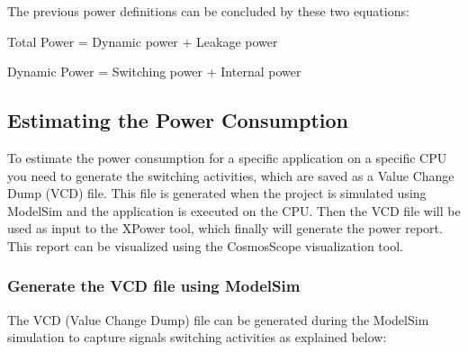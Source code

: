 \documentclass[
]{article}
\begin{document}
The previous power definitions can be concluded by these two equations:

Total Power = Dynamic power + Leakage power

Dynamic Power = Switching power + Internal power

\hypertarget{estimating-the-power-consumption}{%
\subsection{Estimating the Power
Consumption}\label{estimating-the-power-consumption}}

To estimate the power consumption for a specific application on a
specific CPU you need to generate the switching activities, which are
saved as a Value Change Dump (VCD) file. This file is generated when the
project is simulated using ModelSim and the application is executed on
the CPU. Then the VCD file will be used as input to the XPower tool,
which finally will generate the power report. This report can be
visualized using the CosmosScope visualization tool.

\hypertarget{generate-the-vcd-file-using-modelsim}{%
\subsubsection{Generate the VCD file using
ModelSim}\label{generate-the-vcd-file-using-modelsim}}

The VCD (Value Change Dump) file can be generated during the ModelSim
simulation to capture signals switching activities as explained below:
\end{document}
